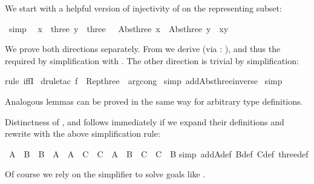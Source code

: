 \begin{isabellebody}
\begin{isamarkuptext}
We start with a helpful version of injectivity of  on the
representing subset:%
\end{isamarkuptext}%
\ {\isacharbrackleft}simp{\isacharbrackright}{\isacharcolon}\isanewline
\ {\isachardoublequote}{\isasymlbrakk}\ x\ {\isasymin}\ three{\isacharsemicolon}\ y\ {\isasymin}\ three\ {\isasymrbrakk}\ {\isasymLongrightarrow}\ {\isacharparenleft}Abs{\isacharunderscore}three\ x\ {\isacharequal}\ Abs{\isacharunderscore}three\ y{\isacharparenright}\ {\isacharequal}\ {\isacharparenleft}x{\isacharequal}y{\isacharparenright}{\isachardoublequote}%
\begin{isamarkuptxt}%
\noindent
We prove both directions separately. From 
we derive  (via
: ), and thus the required  by simplification with . The other direction
is trivial by simplification:%
\end{isamarkuptxt}%
rule\ iffI{\isacharparenright}\isanewline
\ drule{\isacharunderscore}tac\ f\ {\isacharequal}\ Rep{\isacharunderscore}three\ \ arg{\isacharunderscore}cong{\isacharparenright}\isanewline
\ simp\ add{\isacharcolon}Abs{\isacharunderscore}three{\isacharunderscore}inverse{\isacharparenright}\isanewline
{}\ simp%
\begin{isamarkuptext}%
\noindent
Analogous lemmas can be proved in the same way for arbitrary type definitions.

Distinctness of ,  and  follows immediately
if we expand their definitions and rewrite with the above simplification rule:%
\end{isamarkuptext}%
\ {\isachardoublequote}A\ {\isasymnoteq}\ B\ {\isasymand}\ B\ {\isasymnoteq}\ A\ {\isasymand}\ A\ {\isasymnoteq}\ C\ {\isasymand}\ C\ {\isasymnoteq}\ A\ {\isasymand}\ B\ {\isasymnoteq}\ C\ {\isasymand}\ C\ {\isasymnoteq}\ B{\isachardoublequote}\isanewline
{}simp\ add{\isacharcolon}A{\isacharunderscore}def\ B{\isacharunderscore}def\ C{\isacharunderscore}def\ three{\isacharunderscore}def{\isacharparenright}%
\begin{isamarkuptext}%
\noindent
Of course we rely on the simplifier to solve goals like .


\end{isamarkuptext}
\end{isabellebody}
